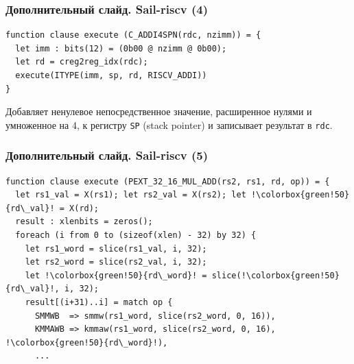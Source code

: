 \documentclass
  [ russian
  , aspectratio=169 %
  ] {beamer}
\begin{document}
\begin{frame}[fragile]
    \frametitle{Дополнительный слайд. Sail-riscv (4)}

    \begin{lstlisting}[caption={Пример \texttt{execute} функции, которая вызывает другой \texttt{execute}}, language=sail, escapechar=!, frame=single]
function clause execute (C_ADDI4SPN(rdc, nzimm)) = {
  let imm : bits(12) = (0b00 @ nzimm @ 0b00);
  let rd = creg2reg_idx(rdc);
  execute(ITYPE(imm, sp, rd, RISCV_ADDI))
}
    \end{lstlisting}

    Добавляет ненулевое непосредственное значение, расширенное нулями и умноженное на 4, к регистру \texttt{SP} (stack pointer) и записывает результат в \texttt{rdc}.

\end{frame}


\begin{frame}[fragile]
    \frametitle{Дополнительный слайд. Sail-riscv (5)}

    \begin{lstlisting}[caption={Пример необходимости удаления неиспользуемых выражений после специализации функции}, language=sail, escapechar=!, frame=single]
function clause execute (PEXT_32_16_MUL_ADD(rs2, rs1, rd, op)) = {
  let rs1_val = X(rs1); let rs2_val = X(rs2); let !\colorbox{green!50}{rd\_val}! = X(rd);
  result : xlenbits = zeros();
  foreach (i from 0 to (sizeof(xlen) - 32) by 32) {
    let rs1_word = slice(rs1_val, i, 32);
    let rs2_word = slice(rs2_val, i, 32);
    let !\colorbox{green!50}{rd\_word}! = slice(!\colorbox{green!50}{rd\_val}!, i, 32);
    result[(i+31)..i] = match op {
      SMMWB  => smmw(rs1_word, slice(rs2_word, 0, 16)),
      KMMAWB => kmmaw(rs1_word, slice(rs2_word, 0, 16), !\colorbox{green!50}{rd\_word}!),
      ...
    \end{lstlisting}


\end{frame}
\end{document}
